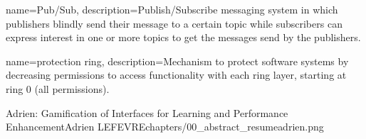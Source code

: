 



{
    name=Pub/Sub,
    description={Publish/Subscribe messaging system in which publishers blindly send their message to a certain topic while subscribers can express interest in one or more topics to get the messages send by the publishers.}
}

{
    name=protection ring,
    description={Mechanism to protect software systems by decreasing permissions to access functionality with each ring layer, starting at ring 0 (all permissions).}
}


\begin{thesis}{Adrien: Gamification of Interfaces for Learning and Performance Enhancement}{Adrien LEFEVRE}{chapters/00_abstract_resume}{adrien.png}{}
    
    
    
    
    
\end{thesis}
